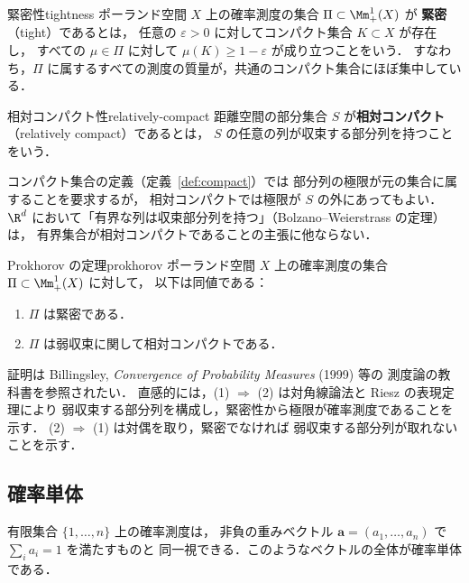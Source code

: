 \begin{definition}{緊密性}{tightness}
  ポーランド空間 $X$ 上の確率測度の集合 $\Pi \subset \Mm_+^1(X)$ が
  \textbf{緊密}（tight）であるとは，
  任意の $\varepsilon > 0$ に対してコンパクト集合 $K \subset X$ が存在し，
  すべての $\mu \in \Pi$ に対して $\mu(K) \geq 1 - \varepsilon$ が成り立つことをいう．
  すなわち，$\Pi$ に属するすべての測度の質量が，共通のコンパクト集合にほぼ集中している．
\end{definition}

\begin{definition}{相対コンパクト性}{relatively-compact}
  距離空間の部分集合 $S$ が\textbf{相対コンパクト}（relatively compact）であるとは，
  $S$ の任意の列が収束する部分列を持つことをいう．
\end{definition}

コンパクト集合の定義（定義~\ref{def:compact}）では
部分列の極限が元の集合に属することを要求するが，
相対コンパクトでは極限が $S$ の外にあってもよい．
$\R^d$ において「有界な列は収束部分列を持つ」（Bolzano--Weierstrass の定理）は，
有界集合が相対コンパクトであることの主張に他ならない．

\begin{theorem}{Prokhorov の定理}{prokhorov}
  ポーランド空間 $X$ 上の確率測度の集合 $\Pi \subset \Mm_+^1(X)$ に対して，
  以下は同値である：
  \begin{enumerate}
    \item $\Pi$ は緊密である．
    \item $\Pi$ は弱収束に関して相対コンパクトである．
  \end{enumerate}
\end{theorem}

証明は Billingsley, \textit{Convergence of Probability Measures} (1999) 等の
測度論の教科書を参照されたい．
直感的には，(1) $\Rightarrow$ (2) は対角線論法と Riesz の表現定理により
弱収束する部分列を構成し，緊密性から極限が確率測度であることを示す．
(2) $\Rightarrow$ (1) は対偶を取り，緊密でなければ
弱収束する部分列が取れないことを示す．

\subsection{確率単体}
\label{subsec:simplex}

有限集合 $\{1, \ldots, n\}$ 上の確率測度は，
非負の重みベクトル $\mathbf{a} = (a_1, \ldots, a_n)$ で $\sum_i a_i = 1$ を満たすものと
同一視できる．このようなベクトルの全体が確率単体である．

